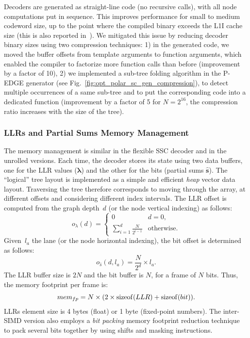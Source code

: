 Decoders are generated as straight-line code (no recursive calls), with all node
computations put in sequence. This improves performance for small to medium
codeword size, up to the point where the compiled binary exceeds the L1I cache
size (this is also reported in~\cite{Giard2016b}). We mitigated this issue by
reducing decoder binary sizes using two compression techniques: 1) in the
generated code, we moved the buffer offsets from template arguments to function
arguments, which enabled the compiler to factorize more function calls than
before (improvement by a factor of 10), 2) we implemented a sub-tree folding
algorithm in the P-EDGE generator (see
Fig.~\ref{fig:opt_polar_sc_gen_compression}), to detect multiple occurrences of
a same sub-tree and to put the corresponding code into a dedicated function
(improvement by a factor of 5 for $N=2^{16}$, the compression ratio increases
with the size of the tree).

\subsubsection{LLRs and Partial Sums Memory Management}

The memory management is similar in the flexible SSC decoder and in the unrolled
versions. Each time, the decoder stores its state using two data buffers, one
for the LLR values ($\bm{\lambda}$) and the other for the bits (partial sums
$\bm{\hat{s}}$). The ``logical'' tree layout is implemented as a simple and
efficient \emph{heap} vector data layout. Traversing the tree therefore
corresponds to moving through the array, at different offsets and considering
different index intervals. The LLR offset is computed from the graph depth~$d$
(or the node vertical indexing) as follows:
\begin{equation}
 o_{\lambda}(d) = \begin{cases}
   0                                         &\text{$d = 0$},\\
   \sum\limits_{i = 1}^{d} \frac{N}{2^{i-1}} &\text{otherwise.}
\end{cases}
\end{equation}
Given~$l_a$ the lane (or the node horizontal indexing), the bit offset is
determined as follows:
\begin{equation}
  o_{\hat{s}}(d,l_a) = \frac{N}{2^d} \times l_a.
\end{equation}
The LLR buffer size is $2N$ and the bit buffer is $N$, for a frame of $N$ bits.
Thus, the memory footprint per frame is:
\begin{equation}
  mem_{fp} = N \times (2 \times \operatorname*{sizeof}(LLR) + \operatorname*{sizeof}(bit)).
\end{equation}
LLRs element size is 4 bytes (float) or 1 byte (fixed-point numbers). The
inter-SIMD version also employs a \emph{bit packing} memory footprint reduction
technique~\cite{LeGal2015a} to pack several bits together by using shifts and
masking instructions.

